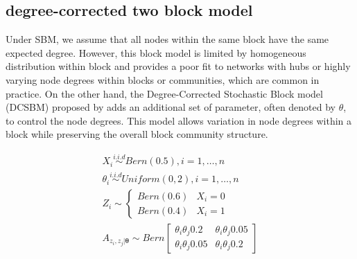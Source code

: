 \documentclass[12pt]{article}
\theoremstyle{definition}
\begin{document}
\subsection{degree-corrected two block model}

Under SBM, we assume that all nodes within the same block have the same expected degree. However, this block model is limited by homogeneous distribution within block and provides a poor fit to networks with hubs or highly varying node degrees within blocks or communities, which are common in practice. On the other hand, the Degree-Corrected Stochastic Block model (DCSBM) proposed by \cite{karrer2011stochastic} adds an additional set of parameter, often denoted by $\theta$, to control the node degrees. This model allows variation in node degrees within a block while preserving the overall block community structure. 

\begin{equation}
\label{eq:dcSBM}
\begin{gathered}
X_{i} \overset{i.i.d}{\sim} Bern(0.5), i = 1, \ldots , n \\ 
\theta_{i} \overset{i.i.d}{\sim} Uniform(0,2), i = 1, \ldots, n \\ 
Z_{i}  \sim  \left\{  \begin{array}{cc} Bern(0.6) & X_{i} = 0 \\ Bern(0.4) & X_{i} = 1  \end{array} \right. \\
A_{z_{i}, z_{j} | \mathbf{\theta}} \sim Bern \left[  \begin{array}{cc}  \theta_{i} \theta_{j} 0.2 &  \theta_{i} \theta_{j} 0.05  \\  \theta_{i} \theta_{j} 0.05 &  \theta_{i} \theta_{j} 0.2 \end{array}  \right]
\end{gathered}
\end{equation}
\end{document}

